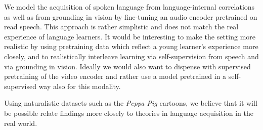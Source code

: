We model the acquisition of spoken language from 
language-internal correlations as well as from grounding in vision 
by fine-tuning an audio encoder pretrained on read speech. This 
approach is rather simplistic and does not match the real experience of 
language learners. It would be interesting to make the setting
more realistic by using pretraining data which reflect a young
learner's experience more closely, and to realistically interleave learning via
self-supervision from speech and via grounding in vision.
Ideally we would also want to dispense with supervised pretraining of 
the video encoder and rather use a model pretrained in a
self-supervised way also for this modality.

Using naturalistic datasets such as the \textit{Peppa Pig} cartoons,
we believe that it will be possible relate findings more closely to
theories in language acquisition in the real world.
